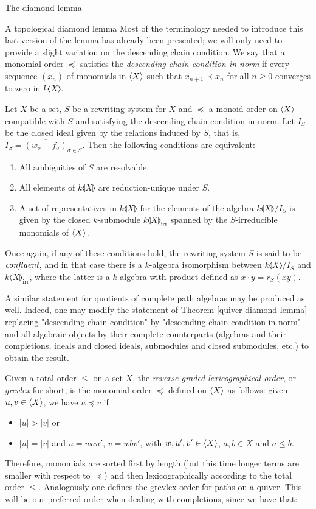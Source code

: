 \begin{chapter}{The diamond lemma}
\begin{section}{A topological diamond lemma}
Most of the terminology needed to introduce this last version of the lemma has already been presented; we will only need to provide a slight variation on the descending chain condition. We say that a monomial order $\preceq$ satisfies the \emph{descending chain condition in norm} if every sequence $(x_n)$ of monomials in $\langle X\rangle$ such that $x_{n+1}\prec x_n$ for all $n\geq 0$ converges to zero in $k\llangle X\rrangle$.

\begin{thm} Let $X$ be a set, $S$ be a rewriting system for $X$ and $\preceq$ a monoid order on $\langle X\rangle$ compatible with $S$ and satisfying the descending chain condition in norm. Let $I_S$ be the closed ideal given by the relations induced by $S$, that is, $I_S=\overline{(w_\sigma-f_\sigma)}_{\sigma\in S}$. Then the following conditions are equivalent:
\begin{enumerate}
\item All ambiguities of $S$ are resolvable.
\item All elements of $k\llangle X\rrangle$ are reduction-unique under $S$.
\item A set of representatives in $k\llangle X\rrangle$ for the elements of the algebra $k\llangle X\rrangle/I_S$ is given by the closed $k$-submodule $k\llangle X\rrangle_{\mathrm{irr}}$ spanned by the $S$-irreducible monomials of $\langle X\rangle$.
\end{enumerate}
Once again, if any of these conditions hold, the rewriting system $S$ is said to be $\emph{confluent}$, and in that case  there is a $k$-algebra isomorphism between $k\llangle X\rrangle/I_S$ and $k\llangle X\rrangle_{\mathrm{irr}}$, where the latter is a $k$-algebra with product defined as $x\cdot y= r_S(xy)$.
\end{thm}

A similar statement for quotients of complete path algebras may be produced as well. Indeed, one may modify the statement of \hyperref[quiver-diamond-lemma]{Theorem \ref*{quiver-diamond-lemma}} replacing "descending chain condition" by "descending chain condition in norm" and all algebraic objects by their complete counterparts (algebras and their completions, ideals and closed ideals, submodules and closed submodules, etc.) to obtain the result.

Given a total order $\leq$ on a set $X$, the \emph{reverse graded lexicographical order}, or \emph{grevlex} for short, is the monomial order $\preceq$ defined on $\langle X\rangle$ as follows: given $u,v\in \langle X\rangle$, we have $u\preceq v$ if
\begin{itemize}
\item $|u| > |v|$ or
\item $|u| = |v|$ and $u=wau'$, $v=wbv'$, with $w,u',v'\in \langle X\rangle$, $a,b\in X$ and $a\leq b$.
\end{itemize}
Therefore, monomials are sorted first by length (but this time longer terms are smaller with respect to $\preceq$) and then lexicographically according to the total order $\leq$. Analogously one defines the grevlex order for paths on a quiver. This will be our preferred order when dealing with completions, since we have that:


\end{section}
\end{chapter}
